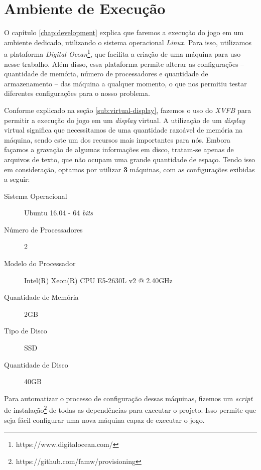 
\section{\label{section:environment}Ambiente de Execução}

O capítulo \ref{chap:development} explica que faremos a execução do jogo em um
ambiente dedicado, utilizando o sistema operacional \textit{Linux}. Para isso,
utilizamos a plataforma \textit{Digital
Ocean}\footnote{https://www.digitalocean.com/}, que facilita a criação de uma
máquina para uso nesse trabalho. Além disso, essa plataforma permite alterar as
configurações -- quantidade de memória, número de processadores e quantidade de
armazenamento -- das máquina a qualquer momento, o que nos permitiu testar
diferentes configurações para o nosso problema.

Conforme explicado na seção \ref{sub:virtual-display}, fazemos o uso do
\textit{XVFB} para permitir a execução do jogo em um \textit{display} virtual. A
utilização de um \textit{display} virtual significa que necessitamos de uma
quantidade razoável de memória na máquina, sendo este um dos recursos mais
importantes para nós. Embora façamos a gravação de algumas informações em disco,
tratam-se apenas de arquivos de texto, que não ocupam uma grande quantidade de
espaço. Tendo isso em consideração, optamos por utilizar \textbf{3} máquinas,
com as configurações exibidas a seguir:

\begin{description}
    \item [Sistema Operacional] Ubuntu 16.04 - 64 \textit{bits}
    \item [Número de Processadores] 2
    \item [Modelo do Processador] Intel(R) Xeon(R) CPU E5-2630L v2 @ 2.40GHz
    \item [Quantidade de Memória] 2GB
    \item [Tipo de Disco] SSD
    \item [Quantidade de Disco] 40GB
\end{description}

Para automatizar o processo de configuração dessas máquinas, fizemos um
\textit{script} de instalação\footnote{https://github.com/famw/provisioning} de
todas as dependências para executar o projeto. Isso permite que seja fácil
configurar uma nova máquina capaz de executar o jogo.

